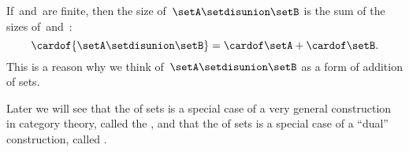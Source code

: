 \begin{remark}
    If~\setA and~\setB are finite, then the size of~$\setA \setdisunion \setB$ is the sum of the sizes of~\setA and~\setB:
    \begin{equation}
        \cardof{ \setA \setdisunion \setB} = \cardof \setA + \cardof \setB.
    \end{equation}
    This is a reason why we think of~$\setA \setdisunion \setB$ as a form of addition of sets.
\end{remark}

\begin{remark}
    Later we will see that the  of sets is a special case of a very general construction in category theory, called the , and that the  of sets is a special case of a ``dual'' construction, called .
\end{remark}
